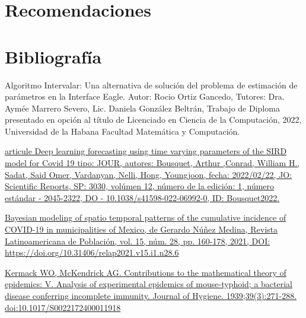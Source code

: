 \documentclass{article}
\begin{document}
\newpage

\section*{ \Huge Recomendaciones }
\label{sec:20}

\newpage

\section*{ \Huge Bibliografía }
\label{sec:21}

\begin{itemize}

    \begin{thebibliography}
    
      {Algoritmo Intervalar: Una alternativa de solución del problema de estimación de parámetros en la Interface Eagle. Autor: Rocio Ortiz Gancedo, Tutores: Dra. Aymée Marrero Severo, Lic. Daniela González Beltrán, Trabajo de Diploma presentado en opción al título de Licenciado en Ciencia de la Computación, 2022, Universidad de la Habana Facultad Matemática y Computación.}
     \label{sec:1}

    \bibitem[2]{}\href{https://doi.org/10.1038/s41598-022-06992-0}{ articule Deep learning forecasting using time varying parameters of the SIRD model for Covid 19 tipo: JOUR, autores: Bousquet, Arthur ,Conrad, William H., Sadat, Said Omer, Vardanyan, Nelli, Hong, Youngjoon, fecha: 2022/02/22, JO: Scientific Reports, SP: 3030, volúmen 12, número de la edición: 1, número estándar   - 2045-2322, DO  - 10.1038/s41598-022-06992-0, ID: Bousquet2022.}
     \label{sec:2}
    
    \bibitem[3]{}  \href{https://www.redalyc.org/journal/3238/323864536006/html/}{Bayesian modeling of spatio temporal patterns of the cumulative incidence of COVID-19 in municipalities of Mexico, de Gerardo Núñez Medina, \href{https://revistarelap.org/index.php/relap}{ Revista Latinoamericana de Población}, vol. 15, núm. 28, pp. 160-178, 2021, DOI:  https://doi.org/10.31406/relap2021.v15.i1.n28.6}
      \label{sec:3}
    
    \bibitem[4]{}\href{https://www.semanticscholar.org/paper/Contributions-to-the-mathematical-theory-of-V.-of-a-Kermack-Mckendrick/7beba9b40b692c2daa9975861394aefddcbe602b}{ Kermack WO, McKendrick AG. Contributions to the mathematical theory of epidemics: V. Analysis of experimental epidemics of mouse-typhoid; a bacterial disease conferring incomplete immunity.
Journal of Hygiene. 1939;39(3):271-288. doi:10.1017/S0022172400011918}
     \label{sec:4}
    

\end{thebibliography}
\end{itemize}
\end{document}
